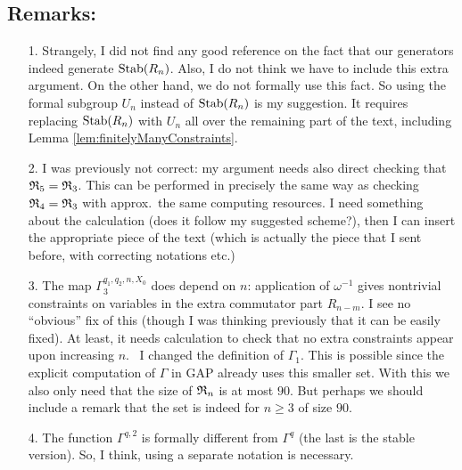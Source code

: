 \documentclass[a4paper,11pt]{amsart}
\newcommand\replaceTh[2]{\st{#1}{\color{DeepPink1}\ #2}}
\begin{document}

\appendix
% 
%

\subsection*{\color{blue}Remarks:}

\begin{enumerate}
\item[1.]
Strangely, I did not find any good reference on the fact that our generators indeed generate $\operatorname{Stab}(R_n)$.
Also, I do not think we have to include this extra argument. On the other hand, we do not formally
use this fact. So using the formal subgroup $U_n$ instead of $\operatorname{Stab}(R_n)$ is my suggestion. 
It requires replacing $\operatorname{Stab}(R_n)$
with $U_n$ all over the remaining part of the text, including Lemma \ref{lem:finitelyManyConstraints}.

\item[2.]
I was previously not correct: my argument needs also direct checking that $\mathfrak{R}_5 = \mathfrak{R}_3$.
This can be performed in precisely the same way as checking $\mathfrak{R}_4 = \mathfrak{R}_3$ with approx.\ the same
computing resources. I need something about the calculation (does it follow my suggested scheme?), then 
I can insert the appropriate piece of the text (which is actually the piece that I sent before, with correcting
notations etc.)

\item[3.]
The map $\Gamma_3^{q_1,q_2,n,X_0}$ does depend on $n$: application of $\omega^{-1}$ gives 
nontrivial constraints on variables in the extra commutator part $R_{n-m}$.
I see no ``obvious'' fix of this (though I was thinking previously that it can be easily fixed).
At least, it needs calculation to check that no extra constraints appear upon increasing $n$.
\replaceTh{}{I changed the definition of $\Gamma_1$. This is possible since the 
explicit computation of $\Gamma$ in GAP already uses this smaller set. 
With this we also only need that the size of $\mathfrak{R}_n$ is at most $90$. But perhaps we should include a remark that the set is indeed for $n\geq 3$ of size $90$.}
\item[4.]
The function $\Gamma^{q,2}$ is formally different from $\Gamma^{q}$ (the last is the stable version). 
So, I think, using a separate notation is necessary.
\end{enumerate}
\end{document}

